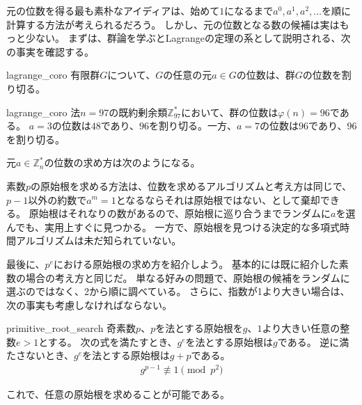 元の位数を得る最も素朴なアイディアは、始めて$1$になるまで$a^0, a^1, a^2, \ldots$を順に計算する方法が考えられるだろう。
しかし、元の位数となる数の候補は実はもっと少ない。
まずは、群論を学ぶとLagrangeの定理の系として説明される、次の事実を確認する。

\begin{Prop}{}{lagrange_coro}
有限群$G$について、$G$の任意の元$a\in G$の位数は、群$G$の位数を割り切る。
\end{Prop}

\begin{Exam}{}{lagrange_coro}
法$n=97$の既約剰余類$\mathbb{Z}_{97}^*$において、群の位数は$\varphi(n)=96$である。
$a=3$の位数は$48$であり、$96$を割り切る。一方、$a=7$の位数は$96$であり、$96$を割り切る。
\end{Exam}

元$a \in \mathbb{Z}_n^*$の位数の求め方は次のようになる。


素数$p$の原始根を求める方法は、位数を求めるアルゴリズムと考え方は同じで、$p-1$以外の約数で$a^{m}=1$となるならそれは原始根ではない、として棄却できる。
原始根はそれなりの数があるので、原始根に巡り合うまでランダムに$a$を選んでも、実用上すぐに見つかる。
一方で、原始根を見つける決定的な多項式時間アルゴリズムは未だ知られていない。

最後に、$p^e$における原始根の求め方を紹介しよう。
基本的には既に紹介した素数の場合の考え方と同じだ。
単なる好みの問題で、原始根の候補をランダムに選ぶのではなく、2から順に調べている。
さらに、指数が1より大きい場合は、次の事実も考慮しなければならない。

\begin{Prop}{}{primitive_root_search}
奇素数$p$、$p$を法とする原始根を$g$、$1$より大きい任意の整数$e>1$とする。
次の式を満たすとき、$g^e$を法とする原始根は$g$である。
逆に満たさないとき、$g^e$を法とする原始根は$g+p$である。
\begin{align*}
g^{p-1} \not\equiv 1 \pmod{p^2}
\end{align*}
\end{Prop}

これで、任意の原始根を求めることが可能である。


